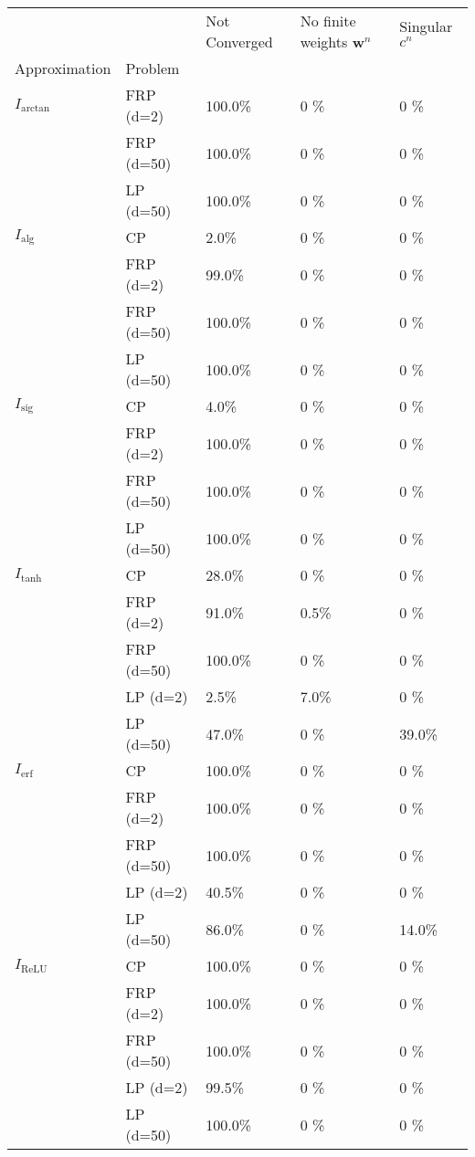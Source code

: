 \begin{tabular}{lllll}
 &  & Not Converged & No finite weights $\bm{{w}}^n$ & Singular $c^n$ \\
Approximation & Problem &  &  &  \\
$I_\text{arctan}$ & FRP (d=2) & 100.0\% & 0 \% & 0 \% \\
 & FRP (d=50) & 100.0\% & 0 \% & 0 \% \\
 & LP (d=50) & 100.0\% & 0 \% & 0 \% \\
\cline{1-5}
$I_\text{alg}$ & CP & 2.0\% & 0 \% & 0 \% \\
 & FRP (d=2) & 99.0\% & 0 \% & 0 \% \\
 & FRP (d=50) & 100.0\% & 0 \% & 0 \% \\
 & LP (d=50) & 100.0\% & 0 \% & 0 \% \\
\cline{1-5}
$I_\text{sig}$ & CP & 4.0\% & 0 \% & 0 \% \\
 & FRP (d=2) & 100.0\% & 0 \% & 0 \% \\
 & FRP (d=50) & 100.0\% & 0 \% & 0 \% \\
 & LP (d=50) & 100.0\% & 0 \% & 0 \% \\
\cline{1-5}
$I_\text{tanh}$ & CP & 28.0\% & 0 \% & 0 \% \\
 & FRP (d=2) & 91.0\% & 0.5\% & 0 \% \\
 & FRP (d=50) & 100.0\% & 0 \% & 0 \% \\
 & LP (d=2) & 2.5\% & 7.0\% & 0 \% \\
 & LP (d=50) & 47.0\% & 0 \% & 39.0\% \\
\cline{1-5}
$I_\text{erf}$ & CP & 100.0\% & 0 \% & 0 \% \\
 & FRP (d=2) & 100.0\% & 0 \% & 0 \% \\
 & FRP (d=50) & 100.0\% & 0 \% & 0 \% \\
 & LP (d=2) & 40.5\% & 0 \% & 0 \% \\
 & LP (d=50) & 86.0\% & 0 \% & 14.0\% \\
\cline{1-5}
$I_\text{ReLU}$ & CP & 100.0\% & 0 \% & 0 \% \\
 & FRP (d=2) & 100.0\% & 0 \% & 0 \% \\
 & FRP (d=50) & 100.0\% & 0 \% & 0 \% \\
 & LP (d=2) & 99.5\% & 0 \% & 0 \% \\
 & LP (d=50) & 100.0\% & 0 \% & 0 \% \\
\cline{1-5}
\end{tabular}
